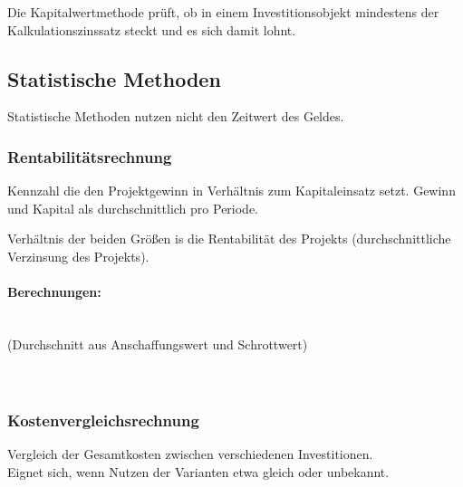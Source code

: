 Die Kapitalwertmethode prüft, ob in einem Investitionsobjekt mindestens der Kalkulationszinssatz steckt und es sich damit lohnt.

\subsection{Statistische Methoden}
Statistische Methoden nutzen nicht den Zeitwert des Geldes.

\subsubsection{Rentabilitätsrechnung}
Kennzahl die den Projektgewinn in Verhältnis zum Kapitaleinsatz setzt. Gewinn und Kapital als durchschnittlich pro Periode.

Verhältnis der beiden Größen is die Rentabilität des Projekts (durchschnittliche Verzinsung des Projekts).





\paragraph{Berechnungen:}\quad\\
 (Durchschnitt aus Anschaffungswert und Schrottwert)\\
\\
\\


\clearpage
\subsubsection{Kostenvergleichsrechnung}
Vergleich der Gesamtkosten zwischen verschiedenen Investitionen.\\
Eignet sich, wenn Nutzen der Varianten etwa gleich oder unbekannt.

